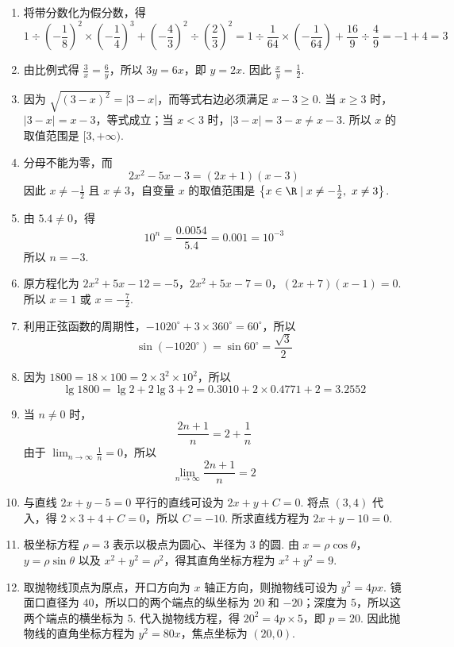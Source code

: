 \begin{solution}
\begin{enumerate}
\item 将带分数化为假分数，得
\[
1\div\left(-\frac{1}{8}\right)^2\times\left(-\frac{1}{4}\right)^3+\left(-\frac{4}{3}\right)^2\div\left(\frac{2}{3}\right)^2
=1\div\frac{1}{64}\times\left(-\frac{1}{64}\right)+\frac{16}{9}\div\frac{4}{9}
=-1+4=3
\]

\item 由比例式得 \(\frac{3}{x}=\frac{6}{y}\)，所以 \(3y=6x\)，即 \(y=2x\). 因此 \(\frac{x}{y}=\frac{1}{2}\).

\item 因为 \(\sqrt{(3-x)^2}=\lvert 3-x\rvert\)，而等式右边必须满足 \(x-3\geqslant0\). 当 \(x\geqslant3\) 时，\(\lvert 3-x\rvert=x-3\)，等式成立；当 \(x<3\) 时，\(\lvert 3-x\rvert=3-x\ne x-3\). 所以 \(x\) 的取值范围是 \([3,+\infty)\).

\item 分母不能为零，而
\[
2x^2-5x-3=(2x+1)(x-3)
\]
因此 \(x\ne-\frac{1}{2}\) 且 \(x\ne3\)，自变量 \(x\) 的取值范围是 \(\left\{x\in\R\mid x\ne-\frac{1}{2},\ x\ne3\right\}\).

\item 由 \(5.4\ne0\)，得
\[
10^n=\frac{0.0054}{5.4}=0.001=10^{-3}
\]
所以 \(n=-3\).

\item 原方程化为
\(2x^2+5x-12=-5\)，\(2x^2+5x-7=0\)，\((2x+7)(x-1)=0\).
所以 \(x=1\) 或 \(x=-\frac{7}{2}\).

\item 利用正弦函数的周期性，\(-1020^\circ+3\times360^\circ=60^\circ\)，所以
\[
\sin(-1020^\circ)=\sin60^\circ=\frac{\sqrt{3}}{2}
\]

\item 因为 \(1800=18\times100=2\times3^2\times10^2\)，所以
\[
\lg1800=\lg2+2\lg3+2=0.3010+2\times0.4771+2=3.2552
\]

\item 当 \(n\ne0\) 时，
\[
\frac{2n+1}{n}=2+\frac{1}{n}
\]
由于 \(\displaystyle\lim_{n\to\infty}\frac{1}{n}=0\)，所以
\[
\displaystyle\lim_{n\to\infty}\frac{2n+1}{n}=2
\]

\item 与直线 \(2x+y-5=0\) 平行的直线可设为 \(2x+y+C=0\). 将点 \((3,4)\) 代入，得 \(2\times3+4+C=0\)，所以 \(C=-10\). 所求直线方程为 \(2x+y-10=0\).

\item 极坐标方程 \(\rho=3\) 表示以极点为圆心、半径为 \(3\) 的圆. 由 \(x=\rho\cos\theta\)，\(y=\rho\sin\theta\) 以及 \(x^2+y^2=\rho^2\)，得其直角坐标方程为 \(x^2+y^2=9\).

\item 取抛物线顶点为原点，开口方向为 \(x\) 轴正方向，则抛物线可设为 \(y^2=4px\). 镜面口直径为 \(40\)，所以口的两个端点的纵坐标为 \(20\) 和 \(-20\)；深度为 \(5\)，所以这两个端点的横坐标为 \(5\). 代入抛物线方程，得 \(20^2=4p\times5\)，即 \(p=20\). 因此抛物线的直角坐标方程为 \(y^2=80x\)，焦点坐标为 \((20,0)\).
\end{enumerate}
\end{solution}

